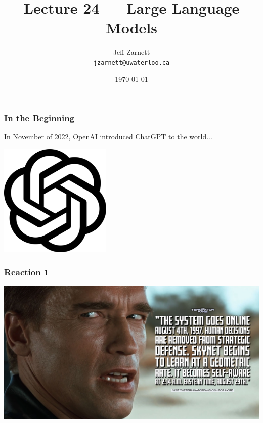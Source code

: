 


\title{Lecture 24 --- Large Language Models }

\author{Jeff Zarnett \\ \small \texttt{jzarnett@uwaterloo.ca}}
\date{\today}




\begin{frame}
  \titlepage

\end{frame}

\begin{frame}
\frametitle{In the Beginning}

In November of 2022, OpenAI introduced ChatGPT to the world...

\begin{center}
	\includegraphics[width=0.4\textwidth]{images/chatgpt.png}
\end{center}

\end{frame}

\begin{frame}
\frametitle{Reaction 1}

\begin{center}
	\includegraphics[width=\textwidth]{images/skynet.png}
\end{center}

\end{frame}

